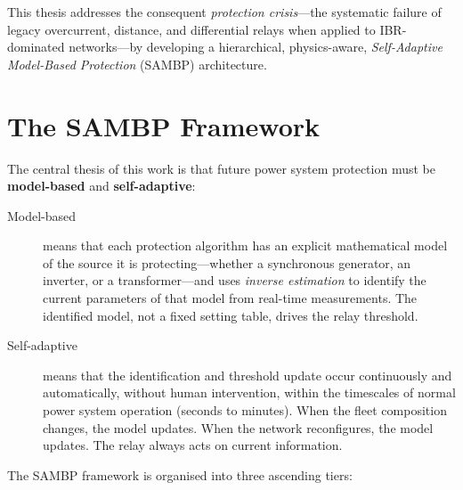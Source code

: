This thesis addresses the consequent \emph{protection crisis}---the systematic
failure of legacy overcurrent, distance, and differential relays when applied
to IBR-dominated networks---by developing a hierarchical, physics-aware,
\emph{Self-Adaptive Model-Based Protection} (SAMBP) architecture.

\section{The SAMBP Framework}
\label{sec:ch1_sambp}

The central thesis of this work is that future power system protection must
be \textbf{model-based} and \textbf{self-adaptive}:

\begin{description}
\item[Model-based] means that each protection algorithm has an explicit
  mathematical model of the source it is protecting---whether a synchronous
  generator, an inverter, or a transformer---and uses \emph{inverse
  estimation} to identify the current parameters of that model from real-time
  measurements. The identified model, not a fixed setting table, drives the
  relay threshold.

\item[Self-adaptive] means that the identification and threshold update
  occur continuously and automatically, without human intervention, within
  the timescales of normal power system operation (seconds to minutes). When
  the fleet composition changes, the model updates. When the network reconfigures,
  the model updates. The relay always acts on current information.
\end{description}

The SAMBP framework is organised into three ascending tiers:

